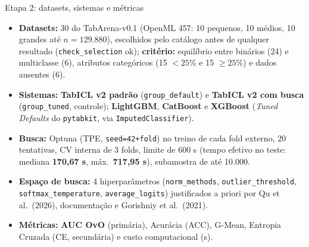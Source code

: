 \documentclass[aspectratio=169,11pt]{beamer}
\begin{document}

\begin{frame}{Etapa 2: datasets, sistemas e métricas}
    \small
    \begin{itemize}
        \setlength{\itemsep}{2pt}
        \item \textbf{Datasets:} 30 do TabArena-v0.1 (OpenML 457: 10 pequenos, 10 médios, 10 grandes até $n=129.880$), escolhidos pelo catálogo antes de qualquer resultado (\texttt{check\_selection} ok); \textbf{critério:} equilíbrio entre binários (24) e multiclasse (6), atributos categóricos (15 $<25\%$ e 15 $\ge 25\%$) e dados ausentes (6).
        \item \textbf{Sistemas:} \textbf{TabICL v2 padrão} (\texttt{group\_default}) e \textbf{TabICL v2 com busca} (\texttt{group\_tuned}, controle); \textbf{LightGBM}, \textbf{CatBoost} e \textbf{XGBoost} (\textit{Tuned Defaults} do \texttt{pytabkit}, via \texttt{ImputedClassifier}).
        \item \textbf{Busca:} Optuna (TPE, \texttt{seed=42+fold}) no treino de cada fold externo, 20 tentativas, CV interna de 3 folds, limite de 600 s (tempo efetivo no teste: mediana \textbf{170,67 s}, máx.\ \textbf{717,95 s}), subamostra de até 10.000.
        \item \textbf{Espaço de busca:} 4 hiperparâmetros (\texttt{norm\_methods}, \texttt{outlier\_threshold}, \texttt{softmax\_temperature}, \texttt{average\_logits}) justificados a priori por Qu et al.\ (2026), documentação e Gorishniy et al.\ (2021).
        \item \textbf{Métricas:} \textbf{AUC OvO} (primária), Acurácia (ACC), G-Mean, Entropia Cruzada (CE, secundária) e custo computacional (s).
    \end{itemize}
\end{frame}
\end{document}
